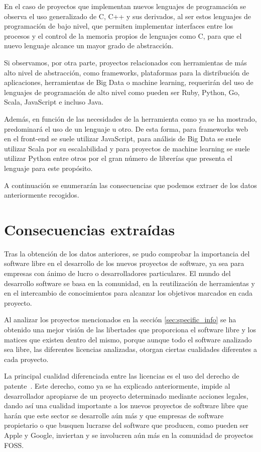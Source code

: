 \documentclass[a4paper, spanish, 12pt]{book}
\begin{document}
En el caso de proyectos que implementan nuevos lenguajes de programaci\'on se observa
el uso generalizado de C, C++ y sus derivados, al ser estos lenguajes de programaci\'on
de bajo nivel, que permiten implementar interfaces entre los procesos y el control de
la memoria propios de lenguajes como C, para que el nuevo lenguaje alcance un mayor grado de abstracci\'on.

Si observamos, por otra parte, proyectos relacionados con herramientas de m\'as alto
nivel de abstracci\'on, como frameworks, plataformas para la distribuci\'on de aplicaciones, herramientas
de Big Data o machine learning, requerir\'an del uso de lenguajes de programaci\'on de alto
nivel como pueden ser Ruby, Python, Go, Scala, JavaScript e incluso Java.

Adem\'as, en funci\'on de las necesidades de la herramienta como ya se ha mostrado,
predominar\'a el uso de un lenguaje u otro. De esta forma, para frameworks web en el
front-end se suele utilizar JavaScript, para an\'alisis de Big Data se suele
utilizar Scala por su escalabilidad y para proyectos de machine learning se suele
utilizar Python entre otros por el gran n\'umero de librer\'ias que presenta el
lenguaje para este prop\'osito.

A continuaci\'on se enumerar\'an las consecuencias que podemos extraer de los datos
anteriormente recogidos.

\section{Consecuencias extra\'idas}
\label{sec:consecuencias}

Tras la obtenci\'on de los datos anteriores, se pudo comprobar la importancia del software libre en el desarrollo de los nuevos
proyectos de software, ya sea para empresas con \'animo de lucro o desarrolladores particulares. El mundo del desarrollo software
se basa en la comunidad, en la reutilizaci\'on de herramientas y en el intercambio de conocimientos para alcanzar los
objetivos marcados en cada proyecto.

Al analizar los proyectos mencionados en la secci\'on \ref{sec:specific_info} se ha obtenido una mejor visi\'on de las libertades que proporciona
el software libre y los matices que existen dentro del mismo, porque aunque todo el software analizado sea
libre, las diferentes licencias analizadas, otorgan ciertas cualidades diferentes a cada proyecto.

La principal cualidad diferenciada entre las licencias es el uso del derecho de patente~\cite{licencias}. Este derecho, como ya se ha
explicado anteriormente, impide al desarrollador apropiarse de un proyecto determinado mediante acciones legales,
dando as\'i una cualidad importante a los nuevos proyectos de software libre que har\'an que este sector se desarrolle
a\'un m\'as y que empresas de software propietario o que busquen lucrarse del software que producen, como pueden ser
Apple y Google, inviertan y se involucren a\'un m\'as en la comunidad de proyectos FOSS.
\end{document}
